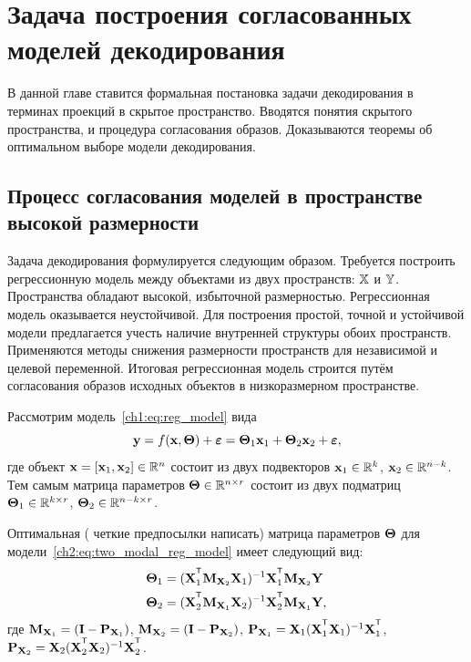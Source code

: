 \chapter{Задача построения согласованных моделей декодирования}
\label{ch:pls}

В данной главе ставится формальная постановка задачи декодирования в терминах проекций в скрытое пространство. 
Вводятся понятия скрытого пространства, и процедура согласования образов.
Доказываются теоремы об оптимальном выборе модели декодирования.

\section{Процесс согласования моделей в пространстве высокой размерности}

\hrulefill

Задача декодирования формулируется следующим образом. 
Требуется построить регрессионную модель между объектами из двух пространств: $\mathbb{X}$ и $\mathbb{Y}$.
Пространства обладают высокой, избыточной размерностью. 
Регрессионная модель оказывается неустойчивой.
Для построения простой, точной и устойчивой модели предлагается учесть наличие внутренней структуры обоих пространств. 
Применяются методы снижения размерности пространств для независимой и целевой переменной. 
Итоговая регрессионная модель строится путём согласования образов исходных объектов в низкоразмерном пространстве. 

\hrulefill

Рассмотрим модель~\eqref{ch1:eq:reg_model} вида
\begin{equation}
	\mathbf{y} = f(\mathbf{x}, \boldsymbol{\Theta}) + \boldsymbol{\varepsilon} = \boldsymbol{\Theta}_1 \mathbf{x}_1 + \boldsymbol{\Theta}_2 \mathbf{x}_2 + \boldsymbol{\varepsilon},
	\label{ch2:eq:two_modal_reg_model}
\end{equation}
где объект $\mathbf{x} = [\mathbf{x}_1, \mathbf{x}_2] \in \mathbb{R}^n$ состоит из двух подвекторов $\mathbf{x}_1 \in \mathbb{R}^k$, $\mathbf{x}_2 \in \mathbb{R}^{n - k}$. Тем самым матрица параметров $\boldsymbol{\Theta} \in \mathbb{R}^{n \times r}$ состоит из двух подматриц $\boldsymbol{\Theta}_1 \in \mathbb{R}^{k \times r}$, $\boldsymbol{\Theta}_2 \in \mathbb{R}^{n - k \times r}$. 

\begin{statement}
	\label{stat:two_modal_params}
	Оптимальная ({\color{red} четкие предпосылки написать}) матрица параметров $\boldsymbol{\Theta}$ для модели~\eqref{ch2:eq:two_modal_reg_model} имеет следующий вид:
	\begin{align*}
		\bTheta_1 &= (\bX_1^{\T} \bM_{\bX_2} \bX_1)^{-1} \bX_1^{\T} \bM_{\bX_2} \bY \\
		\bTheta_2 &= (\bX_2^{\T} \bM_{\bX_1} \bX_2)^{-1} \bX_2^{\T} \bM_{\bX_1} \bY,
	\end{align*}
	где $\mathbf{M}_{\mathbf{X}_1} = (\mathbf{I} - \mathbf{P}_{\mathbf{X}_1})$, $\mathbf{M}_{\mathbf{X}_2} = (\mathbf{I} - \mathbf{P}_{\mathbf{X}_2})$, $\bP_{\bX_1} = \bX_1 (\bX_1^{\T} \bX_1)^{-1} \bX_1^{\T}$, $\bP_{\bX_2} = \bX_2 (\bX_2^{\T} \bX_2)^{-1} \bX_2^{\T}$.
\end{statement}

